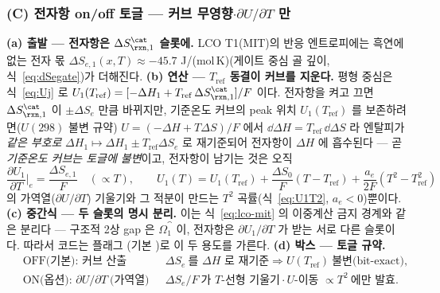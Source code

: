 \subsubsection*{(C) 전자항 on/off 토글 --- 커브 무영향$\cdot$$\partial U/\partial T$ 만}
\textbf{(a) 출발 --- 전자항은 $\Delta S_{\rxn,1}^\cat$ 슬롯에.} LCO T1(MIT)의 반응 엔트로피에는 흑연에 없는
전자 몫 $\Delta S_{e,1}(x,T)\approx-45.7$ J/(mol\,K)(게이트 중심 골 깊이, 식~\eqref{eq:dSegate})가 더해진다.
\textbf{(b) 연산 --- $T_\mathrm{ref}$ 동결이 커브를 지운다.} 평형 중심은 식~\eqref{eq:Uj} 로
$U_1(T_\mathrm{ref})=[-\Delta H_1+T_\mathrm{ref}\,\Delta S_{\rxn,1}^\cat]/F$ 이다. 전자항을 켜고 끄면
$\Delta S_{\rxn,1}^\cat$ 이 $\pm\Delta S_e$ 만큼 바뀌지만, 기준온도 커브의 peak 위치 $U_1(T_\mathrm{ref})$ 를
보존하려면($U(298)$ 불변 규약) $U{=}(-\Delta H{+}T\Delta S)/F$ 에서 $\dd\Delta H=T_\mathrm{ref}\,\dd\Delta S$ 라
엔탈피가 \emph{같은 부호로} $\Delta H_1\mapsto\Delta H_1\pm T_\mathrm{ref}\Delta S_e$ 로 재기준되어
전자항이 $\Delta H$ 에 흡수된다 --- 곧 \emph{기준온도 커브는 토글에 불변}이고, 전자항이 남기는 것은 오직
\begin{equation}
\frac{\partial U_1}{\partial T}\bigg|_e=\frac{\Delta S_{e,1}}{F}\quad(\propto T),\qquad
U_1(T)=U_1(T_\mathrm{ref})+\frac{\Delta S_0}{F}(T-T_\mathrm{ref})+\frac{a_e}{2F}(T^2-T_\mathrm{ref}^2)
\label{eq:lcoom-utref}
\end{equation}
의 가역열($\partial U/\partial T$) 기울기와 그 적분이 만드는 $T^2$ 곡률(식~\eqref{eq:U1T2},
$a_e<0$)뿐이다. \textbf{(c) 중간식 --- 두 슬롯의 명시 분리.} 이는 식~\eqref{eq:lco-mit} 의 이중계산
금지 경계와 같은 분리다 --- 구조적 2상 gap 은 $\Omega_1^\cat$ 이, 전자항은 $\partial U_1/\partial T$ 가
받는 서로 다른 슬롯이다. 따라서 코드는 플래그 (기본 )로 이
두 용도를 가른다. \textbf{(d) 박스 --- 토글 규약.}
\begin{equation}
\boxed{\;
\begin{aligned}
&\text{OFF(기본): 커브 산출} && \Delta S_e\ \text{를 }\Delta H\text{ 로 재기준}\Rightarrow U(T_\mathrm{ref})\ \text{불변(bit-exact)},\\
&\text{ON(옵션): }\partial U/\partial T\ \text{(가역열)} && \Delta S_e/F\ \text{가 }T\text{-선형 기울기}\cdot U\text{-이동 }\propto T^2\ \text{에만 발효}.
\end{aligned}\;}
\label{eq:lcoom-toggle}
\end{equation}

